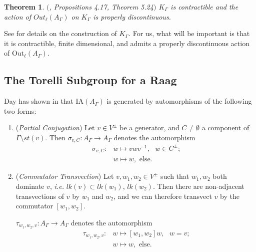\documentclass[11pt]{amsart}
\newtheorem{thm}{Theorem}
\numberwithin{thm}{section}
\theoremstyle{remark}
\theoremstyle{definition}
\newcommand{\overl}[1]{\overline{#1}}
\newcommand{\Out}{\text{Out}}
\newcommand{\IA}{\text{IA}}
\begin{document}
\begin{thm}\label{Contractible}$($\cite{CSV12}, Propositions 4.17, Theorem 5.24$)$ $K_\Gamma$ is contractible and the action of $Out_{\ell}(A_\Gamma)$ on $K_\Gamma$ is properly discontinuous. 
\end{thm}
See \cite{CSV12} for details on the construction of $K_\Gamma$.  For us, what will be important is that it is contractible, finite dimensional, and admits a properly discontinuous action of $\Out_{\ell}(A_\Gamma)$.


\subsection{The Torelli Subgroup for a Raag}
Day has shown in \cite{Day09} that $\IA(A_\Gamma)$ is generated by automorphisms of the following two forms:
\begin{enumerate}
\item (\emph{Partial Conjugation}) Let $v\in V^\pm$ be a generator, and $C\neq\emptyset$ a component of $\Gamma\setminus st(v)$.  Then $\sigma_{v,C}:A_\Gamma\rightarrow A_\Gamma$ denotes the automorphism 
\begin{align*}
	\sigma_{v,C}: &w\mapsto vwv^{-1}, \mbox{ $w\in C^\pm$;}\\
			     &w\mapsto w, \mbox{ else.}
\end{align*}
\item (\emph{Commutator Transvection}) Let $v, w_1, w_2\in V^\pm$ such that $w_1, w_2$ both dominate $v$, \emph{i.e.} $lk(v)\subset lk(w_1)$, $lk(w_2)$.  Then there are non-adjacent transvections of $v$ by $w_1$ and $w_2$, and we can therefore transvect $v$ by the commutator $[w_1,w_2]$.  

$\tau_{w_1,w_2,v}:A_\Gamma\rightarrow A_\Gamma$ denotes the automorphism
\begin{align*}
	\tau_{w_1,w_2,v}: &w\mapsto [w_1,w_2]w, \mbox{ $w=v$;}\\
			     &w\mapsto w, \mbox{ else.}
\end{align*}

\end{enumerate}
\end{document}

